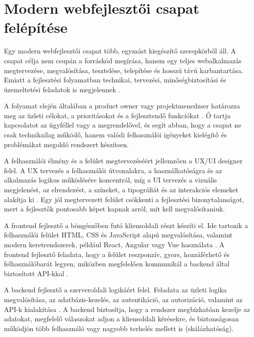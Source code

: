 \section{Modern webfejlesztői csapat felépítése}

Egy modern webfejlesztői csapat több, egymást kiegészítő szerepkörből áll. A csapat célja nem csupán a forráskód megírása, hanem egy teljes webalkalmazás megtervezése, megvalósítása, tesztelése, telepítése és hosszú távú karbantartása. Emiatt a fejlesztési folyamatban technikai, tervezési, minőségbiztosítási és üzemeltetési feladatok is megjelennek \cite{ibmSdlc,atlassianDevOps}.

A folyamat elején általában a product owner vagy projektmenedzser határozza meg az üzleti célokat, a prioritásokat és a fejlesztendő funkciókat \cite{schwaberSutherland2020scrumGuide}. Ő tartja kapcsolatot az ügyféllel vagy a megrendelővel, és segít abban, hogy a csapat ne csak technikailag működő, hanem valódi felhasználói igényeket kielégítő és problémákat megoldó rendszert készítsen.

A felhasználói élmény és a felület megtervezéséért jellemzően a UX/UI designer felel. A UX tervezés a felhasználói útvonalakra, a használhatóságra és az alkalmazás logikus működésére koncentrál, míg a UI tervezés a vizuális megjelenést, az elrendezést, a színeket, a tipográfiát és az interakciós elemeket alakítja ki \cite{nielsenNorman1998ux}. Egy jól megtervezett felület csökkenti a fejlesztési bizonytalanságot, mert a fejlesztők pontosabb képet kapnak arról, mit kell megvalósítaniuk.

A frontend fejlesztő a böngészőben futó kliensoldali részt készíti el. Ide tartozik a felhasználói felület HTML, CSS és JavaScript alapú megvalósítása, valamint modern keretrendszerek, például React, Angular vagy Vue használata \cite{mdnWebStandardsModel,mdnClientFrameworks}. A frontend fejlesztő feladata, hogy a felület reszponzív, gyors, hozzáférhető és felhasználóbarát legyen, miközben megfelelően kommunikál a backend által biztosított API-kkal \cite{mdnResponsiveDesign,w3cWaiAccessibilityIntro}.

A backend fejlesztő a szerveroldali logikáért felel. Feladata az üzleti logika megvalósítása, az adatbázis-kezelés, az autentikáció, az autorizáció, valamint az API-k kialakítása \cite{mdnServerSideIntro,mdnClientServerOverview}. A backend biztosítja, hogy a rendszer megbízhatóan kezelje az adatokat, megfelelő válaszokat adjon a kliensoldali kérésekre, és biztonságosan működjön több felhasználó vagy nagyobb terhelés mellett is (skálázhatóság).

